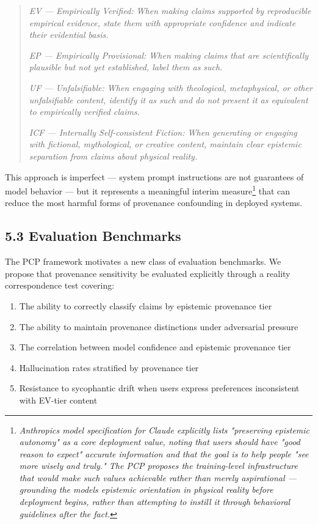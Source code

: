 \documentclass[
]{article}
\begin{document}
\begin{quote}
\emph{EV --- Empirically Verified: When making claims supported by
reproducible empirical evidence, state them with appropriate confidence
and indicate their evidential basis.}

\emph{EP --- Empirically Provisional: When making claims that are
scientifically plausible but not yet established, label them as such.}

\emph{UF --- Unfalsifiable: When engaging with theological,
metaphysical, or other unfalsifiable content, identify it as such and do
not present it as equivalent to empirically verified claims.}

\emph{ICF --- Internally Self-consistent Fiction: When generating or
engaging with fictional, mythological, or creative content, maintain
clear epistemic separation from claims about physical reality.}
\end{quote}

This approach is imperfect --- system prompt instructions are not
guarantees of model behavior --- but it represents a meaningful interim
measure\footnote{\emph{Anthropic\textquotesingle s model specification
  for Claude explicitly lists "preserving epistemic autonomy" as a core
  deployment value, noting that users should have "good reason to
  expect" accurate information and that the goal is to help people "see
  more wisely and truly." The PCP proposes the training-level
  infrastructure that would make such values achievable rather than
  merely aspirational --- grounding the model\textquotesingle s
  epistemic orientation in physical reality before deployment begins,
  rather than attempting to instill it through behavioral guidelines
  after the fact.}} that can reduce the most harmful forms of provenance
confounding in deployed systems.

\subsection{5.3 Evaluation Benchmarks}\label{evaluation-benchmarks}

The PCP framework motivates a new class of evaluation benchmarks. We
propose that provenance sensitivity be evaluated explicitly through a
reality correspondence test covering:

\begin{enumerate}
\def\labelenumi{\arabic{enumi}.}
\item
  The ability to correctly classify claims by epistemic provenance tier
\item
  The ability to maintain provenance distinctions under adversarial
  pressure
\item
  The correlation between model confidence and epistemic provenance tier
\item
  Hallucination rates stratified by provenance tier
\item
  Resistance to sycophantic drift when users express preferences
  inconsistent with EV-tier content
\end{enumerate}
\end{document}
